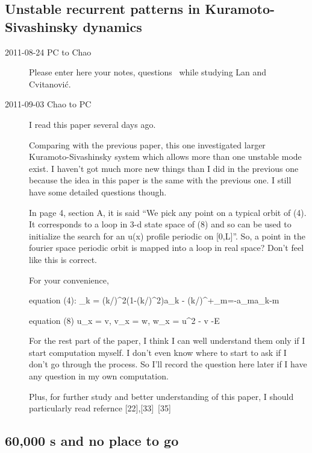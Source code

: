 \subsection{Unstable recurrent patterns in {Kuramoto-Sivashinsky} dynamics}
\label{s:lanCvit07}

\begin{description}

\item[2011-08-24 PC to Chao]
Please enter here your notes, questions \etc\ while studying
Lan and Cvitanovi{\'c}.
\item[2011-09-03 Chao to PC]
I read this paper several days ago.

Comparing with the previous paper, this one investigated larger Kuramoto-Sivashinsky system which allows more than one unstable mode exist. I haven't got much more new things than I did in the previous one because the idea in this paper is the same with the previous one. I still have some detailed questions though. 

In page 4, section A, it is said ``We pick any point on a typical orbit of (4). It corresponds to a loop in 3-d state space of (8) and so can be used to initialize the search for an u(x) profile periodic on [0,L]''. So, a point in the fourier space periodic orbit is mapped into a loop in real space? Don't feel like this is correct.

For your convenience, 

equation (4): 
\beq\displaystyle{}_{k} = (k/)^{2}(1-(k/)^{2})a_{k} - (k/)\sum\nolimits^{+\infty}_{m=-\infty}a_{m}a_{k-m}\eeq

equation (8)  
\beq u_x = v, v_x = w, w_x = u^2 - v -E\eeq

For the rest part of the paper, I think I can well understand them only if I start computation myself. I don't even know where to start to ask if I don't go through the process. So I'll record the question here later if I have any question in my own computation. 

Plus, for further study and better understanding of this paper, I should particularly read refernce [22],[33]~[35]
 
\end{description}



\subsection{60,000 \rpo s and no place to go}
\label{s:SCD07}

